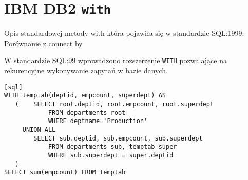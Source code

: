\section{IBM DB2 \texttt{with}}

Opis standardowej metody with która pojawiła się w standardzie SQL:1999. Porównanie z connect by

W standardzie SQL:99 wprowadzono rozszerzenie \texttt{WITH} pozwalające na rekurencyjne wykonywanie zapytań w bazie danych.

\begin{verbatim}[sql]
WITH temptab(deptid, empcount, superdept) AS
   (    SELECT root.deptid, root.empcount, root.superdept
            FROM departments root
            WHERE deptname='Production'
     UNION ALL
        SELECT sub.deptid, sub.empcount, sub.superdept
            FROM departments sub, temptab super
            WHERE sub.superdept = super.deptid
   )
SELECT sum(empcount) FROM temptab
\end{verbatim}

